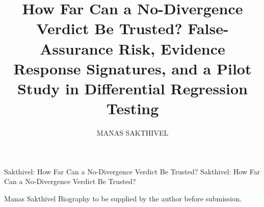 \documentclass{ieeeaccess}
\begin{document}

\title{How Far Can a No-Divergence Verdict Be Trusted? False-Assurance Risk, Evidence Response Signatures, and a Pilot Study in Differential Regression Testing}

\author{\uppercase{Manas Sakthivel}}
\address[1]{Affiliation and e-mail to be supplied by the author before submission}


\markboth
{Sakthivel: How Far Can a No-Divergence Verdict Be Trusted?}
{Sakthivel: How Far Can a No-Divergence Verdict Be Trusted?}


\begin{abstract}

\end{abstract}

\begin{keywords}

\end{keywords}

\titlepgskip=-21pt

\maketitle

















\begin{IEEEbiographynophoto}{Manas Sakthivel}
Biography to be supplied by the author before submission.
\end{IEEEbiographynophoto}

\EOD
\end{document}
